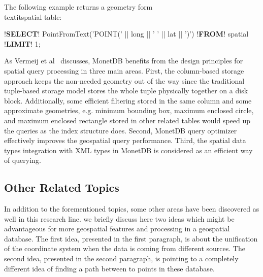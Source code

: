 \documentclass[a4paper,12pt]{article}
\begin{document}
The following example returns a geometry form \\textit{spatial} table:
\vspace{10px}
\begin{fakeJSON}[escapechar=\!]
!\textbf{SELECT}! PointFromText('POINT(' || long || ' ' || lat || ')') !\textbf{FROM}! spatial !\textbf{LIMIT}! 1;
\end{fakeJSON}
\vspace{10px}

As Vermeij et al~\cite{MonetDB} discusses, MonetDB benefits from the design principles for spatial query processing in three main areas. First, the column-based storage approach keeps the non-needed geometry out of the way since the traditional tuple-based storage model stores the whole tuple physically together on a disk block. Additionally, some efficient filtering stored in the same column and some approximate geometries, e.g. minimum bounding box, maximum enclosed circle, and maximum enclosed rectangle stored in other related tables would speed up the queries as the index structure does. Second, MonetDB query optimizer effectively improves the geospatial query performance. Third, the spatial data types integration with XML types in MonetDB is considered as an efficient way of querying. 


\subsection{Other Related Topics}

In addition to the forementioned topics, some other areas have been discovered as well in this research line. 
we briefly discuss here two ideas which might be advantageous 
for more geospatial features and processing in a geospatial database.
The first idea, presented in the first paragraph, is about the unification of the coordinate system when the data
is coming from different sources.  The second idea, presented in the second paragraph, is pointing to a 
completely different idea of finding a path between to points in these database.
\end{document}
